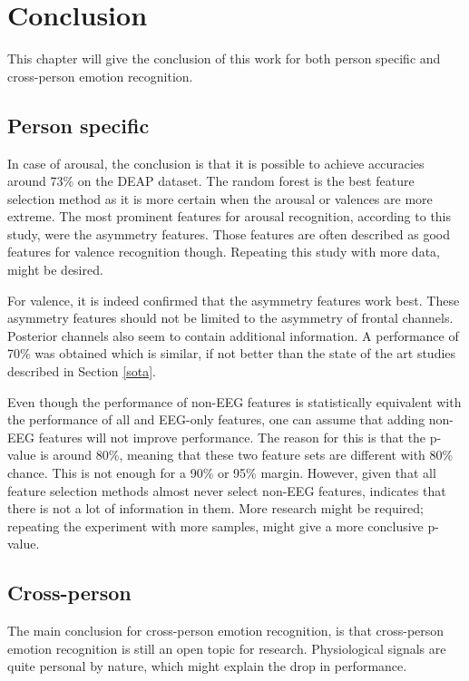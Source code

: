 \chapter{Conclusion}
{\samenvatting This chapter will give the conclusion of this work for both person specific and cross-person emotion recognition.}

\section{Person specific}
In case of arousal, the conclusion is that it is possible to achieve accuracies around 73\% on the DEAP dataset. The random forest is the best feature selection method as it is more certain when the arousal or valences are more extreme. The most prominent features for arousal recognition, according to this study, were the asymmetry features. Those features are often described as good features for valence recognition though. Repeating this study with more data, might be desired.

\npar

For valence, it is indeed confirmed that the asymmetry features work best. These asymmetry features should not be limited to the asymmetry of frontal channels. Posterior channels also seem to contain additional information. A performance of 70\% was obtained which is similar, if not better than the state of the art studies described in Section \ref{sota}. 

\npar

Even though the performance of non-EEG features is statistically equivalent with the performance of all and EEG-only features, one can assume that adding non-EEG features will not improve performance. The reason for this is that the p-value is around 80\%, meaning that these two feature sets are different with 80\% chance. This is not enough for a 90\% or 95\% margin. However, given that all feature selection methods almost never select non-EEG features, indicates that there is not a lot of information in them. More research might be required; repeating the experiment with more samples, might give a more conclusive p-value.

\clearpage

\section{Cross-person}

The main conclusion for cross-person emotion recognition, is that cross-person emotion recognition is still an open topic for research. Physiological signals are quite personal by nature, which might explain the drop in performance.

